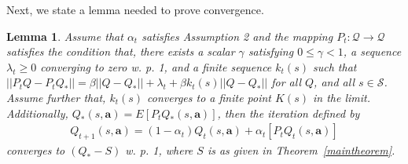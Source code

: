 \documentclass[jair, twoside,11pt,theapa]{article}
\newtheorem{defn}{Definition}
\newtheorem{lemm}{Lemma}
\begin{document}







Next, we state a lemma needed to prove convergence. 


\begin{lemm}\label{corrolorylemma}
Assume that $\alpha_t$ satisfies Assumption 2 and the mapping $P_t: \mathcal{Q} \xrightarrow{} \mathcal{Q}$ satisfies the condition that, there exists a scalar $\gamma$ satisfying $0 \leq \gamma < 1$, a sequence $\lambda_t \geq 0$ converging to zero w. p. 1, and a finite sequence $k_t(s)$ such that $|| P_tQ  - P_t Q_{*} || = \beta ||Q - Q_{*} || + \lambda_t + \beta k_t(s)||Q - Q_{*} ||$ for all $Q$, and all $s \in \mathcal{S}$. Assume further that, $k_t(s)$ converges to a finite point $K(s)$ in the limit. Additionally, $Q_{*}(s, \boldsymbol{a}) = E[P_tQ_{*}(s, \boldsymbol{a}) ]$, then the iteration defined by 
\begin{equation}
    \begin{array}{l}
         Q_{t+1}(s, \boldsymbol{a}) = (1 - \alpha_t)Q_t(s, \boldsymbol{a})  +\alpha_t[P_t Q_t(s, \boldsymbol{a})]
    \end{array}
\end{equation}
converges to $(Q_{*} - S)$ w. p. 1, where $S$ is as given in Theorem~\ref{maintheorem}. 
\end{lemm}
\end{document}
